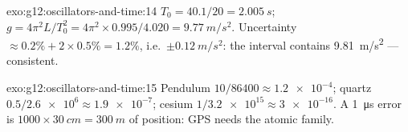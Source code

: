 \begin{solution}{exo:g12:oscillators-and-time:14}
$T_0 = 40.1/20 = \qty{2.005}{s}$; $g = 4\pi^2 L/T_0^2 = 4\pi^2
\times 0.995/4.020 = \qty{9.77}{m/s^2}$. Uncertainty $\approx 0.2\%
+ 2 \times 0.5\% = 1.2\%$, i.e.\ $\pm\qty{0.12}{m/s^2}$: the
interval contains \qty{9.81}{m/s^2} --- consistent.
\end{solution}

\begin{solution}{exo:g12:oscillators-and-time:15}
Pendulum $10/86400 \approx \num{1.2e-4}$; quartz $0.5/\num{2.6e6}
\approx \num{1.9e-7}$; cesium $1/\num{3.2e15} \approx \num{3e-16}$.
A \qty{1}{\micro s} error is $\num{1000} \times \qty{30}{cm} =
\qty{300}{m}$ of position: GPS needs the atomic family.
\end{solution}

